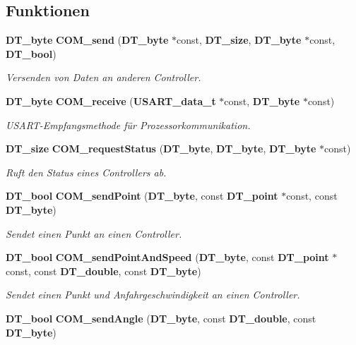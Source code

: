 \subsection*{Funktionen}
\begin{DoxyCompactItemize}
\item 
{\bf DT\_\-byte} {\bf COM\_\-send} ({\bf DT\_\-byte} $\ast$const, {\bf DT\_\-size}, {\bf DT\_\-byte} $\ast$const, {\bf DT\_\-bool})
\begin{DoxyCompactList}\small\item\em Versenden von Daten an anderen Controller. \item\end{DoxyCompactList}\item 
{\bf DT\_\-byte} {\bf COM\_\-receive} ({\bf USART\_\-data\_\-t} $\ast$const, {\bf DT\_\-byte} $\ast$const)
\begin{DoxyCompactList}\small\item\em USART-\/Empfangsmethode für Prozessorkommunikation. \item\end{DoxyCompactList}\item 
{\bf DT\_\-size} {\bf COM\_\-requestStatus} ({\bf DT\_\-byte}, {\bf DT\_\-byte}, {\bf DT\_\-byte} $\ast$const)
\begin{DoxyCompactList}\small\item\em Ruft den Status eines Controllers ab. \item\end{DoxyCompactList}\item 
{\bf DT\_\-bool} {\bf COM\_\-sendPoint} ({\bf DT\_\-byte}, const {\bf DT\_\-point} $\ast$const, const {\bf DT\_\-byte})
\begin{DoxyCompactList}\small\item\em Sendet einen Punkt an einen Controller. \item\end{DoxyCompactList}\item 
{\bf DT\_\-bool} {\bf COM\_\-sendPointAndSpeed} ({\bf DT\_\-byte}, const {\bf DT\_\-point} $\ast$const, const {\bf DT\_\-double}, const {\bf DT\_\-byte})
\begin{DoxyCompactList}\small\item\em Sendet einen Punkt und Anfahrgeschwindigkeit an einen Controller. \item\end{DoxyCompactList}\item 
{\bf DT\_\-bool} {\bf COM\_\-sendAngle} ({\bf DT\_\-byte}, const {\bf DT\_\-double}, const {\bf DT\_\-byte})

\end{DoxyCompactItemize}
